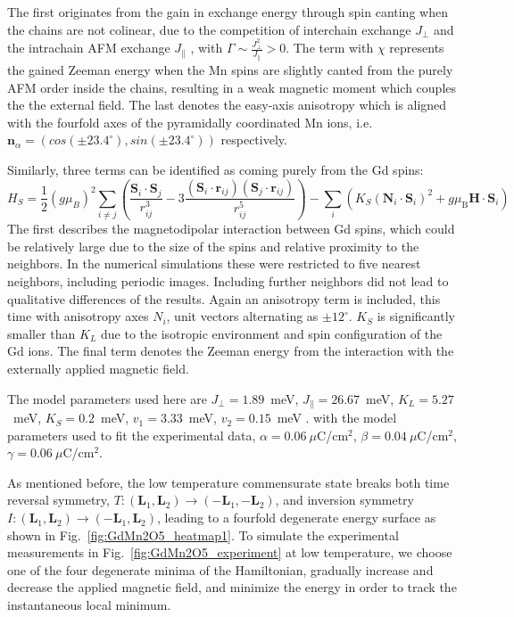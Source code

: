 The first originates from the gain in exchange energy through spin canting when the chains are not colinear, due to the competition of interchain exchange $J_\perp$ and the intrachain AFM exchange $J_\|$ \cite{Sushkov2008} , with $\Gamma\sim\frac{J_{\perp}^2}{J_\|}>0$. The term with $\chi$ represents the gained Zeeman energy when the Mn spins are slightly canted from the purely AFM order inside the chains, resulting in a weak magnetic moment which couples the the external field. The last denotes the easy-axis anisotropy which is aligned with the fourfold axes of the pyramidally coordinated Mn ions, i.e. $\mathbf{n}_\alpha=(cos(\pm23.4^\circ),sin(\pm23.4^\circ))$ respectively.

Similarly, three terms can be identified as coming purely from the Gd spins:
\begin{equation}
     H_S=\frac{1}{2}(g \mu_B)^2\sum_{i\neq j}\left(\frac{\mathbf{S}_i\cdot \mathbf{S}_j}{r_{ij}^3}-3\frac{(\mathbf{S}_i\cdot \mathbf{r}_{ij})(\mathbf{S}_j\cdot \mathbf{r}_{ij})}{r_{ij}^5}\right) - \sum_i\left( K_S(\mathbf{N}_i\cdot \mathbf{S}_i)^2 + g\mu_\mathrm{B} \mathbf{H} \cdot \mathbf{S}_i\right) 
\end{equation}
The first describes the magnetodipolar interaction between Gd spins, which could be relatively large due to the size of the spins and relative proximity to the neighbors. In the numerical simulations these were restricted to five nearest neighbors, including periodic images. Including further neighbors did not lead to qualitative differences of the results. Again an anisotropy term is included, this time with anisotropy axes $N_i$, unit vectors alternating as $\pm 12^\circ$. $K_S$ is significantly smaller than $K_L$ due to the isotropic environment and spin configuration of the Gd ions.
The final term denotes the Zeeman energy from the interaction with the externally applied magnetic field.

The model parameters used here are $J_\perp = 1.89$~meV, $J_\parallel = 26.67$~meV, $K_L = 5.27$~meV, $K_S = 0.2$~meV, $v_1 = 3.33$~meV, $v_2 = 0.15$~meV . 
with the model parameters used to fit the experimental data, $\alpha = 0.06\:\mu$C/cm$^2$, $\beta = 0.04\:\mu$C/cm$^2$, $\gamma = 0.06\:\mu$C/cm$^2$.

As mentioned before, the low temperature commensurate state breaks both time reversal symmetry, $T: (\mathbf{L}_1, \mathbf{L}_2) \rightarrow (-\mathbf{L}_1, -\mathbf{L}_2)$, and inversion symmetry $I:(\mathbf{L}_1, \mathbf{L}_2) \rightarrow (-\mathbf{L}_1, \mathbf{L}_2)$, leading to a fourfold degenerate energy surface as shown in Fig.~\ref{fig:GdMn2O5_heatmap1}. 
To simulate the experimental measurements in Fig.~\ref{fig:GdMn2O5_experiment} at low temperature, we choose one of the four degenerate minima of the Hamiltonian, gradually increase and decrease the applied magnetic field, and minimize the energy in order to track the instantaneous local minimum. 

